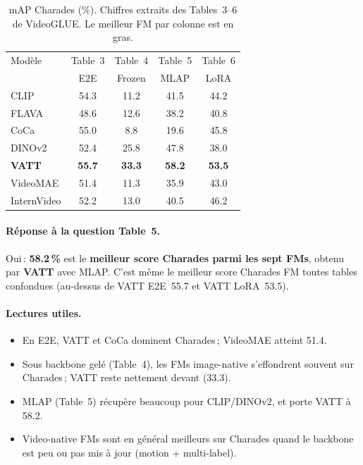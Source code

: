 \documentclass[11pt,a4paper]{article}
\begin{document}
\begin{table}[h]
\centering
\caption{mAP Charades (\%). Chiffres extraits des Tables~3--6 de VideoGLUE.
Le meilleur FM par colonne est en gras.}
\label{tab:charades-map}
\small
\begin{tabular}{@{}lcccc@{}}
\toprule
Mod\`ele &
  Table~3 &
  Table~4 &
  Table~5 &
  Table~6 \\
 & E2E & Frozen & MLAP & LoRA \\
\midrule
CLIP        & 54.3 & 11.2 & 41.5 & 44.2 \\
FLAVA       & 48.6 & 12.6 & 38.2 & 40.8 \\
CoCa        & 55.0 &  8.8 & 19.6 & 45.8 \\
DINOv2      & 52.4 & 25.8 & 47.8 & 38.0 \\
\textbf{VATT} & \textbf{55.7} & \textbf{33.3} & \textbf{58.2} & \textbf{53.5} \\
VideoMAE    & 51.4 & 11.3 & 35.9 & 43.0 \\
InternVideo & 52.2 & 13.0 & 40.5 & 46.2 \\
\bottomrule
\end{tabular}
\end{table}

\paragraph{R\'eponse \`a la question Table~5.}
Oui\,: \textbf{58.2\,\%} est le \textbf{meilleur score Charades parmi les
sept FMs}, obtenu par \textbf{VATT} avec MLAP. C'est m\^{e}me le meilleur
score Charades FM toutes tables confondues (au-dessus de VATT E2E~55.7 et
VATT LoRA~53.5).

\paragraph{Lectures utiles.}
\begin{itemize}[nosep]
  \item En E2E, VATT et CoCa dominent Charades\,; VideoMAE atteint 51.4.
  \item Sous backbone gel\'e (Table~4), les FMs image-native s'effondrent
        souvent sur Charades\,; VATT reste nettement devant (33.3).
  \item MLAP (Table~5) r\'ecup\`ere beaucoup pour CLIP/DINOv2, et porte VATT
        \`a 58.2.
  \item Video-native FMs sont en g\'en\'eral meilleurs sur Charades quand
        le backbone est peu ou pas mis \`a jour (motion + multi-label).
\end{itemize}
\end{document}
